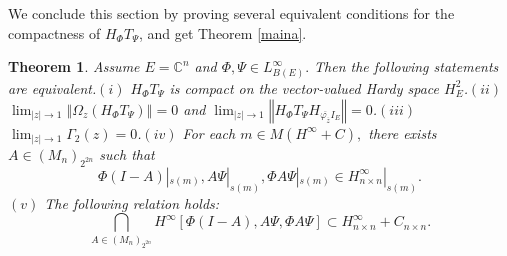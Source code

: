 \documentclass{article}%
\newtheorem{theorem}{Theorem}[section]
\begin{document}
We conclude this section by proving several equivalent conditions for the
compactness of $H_{\Phi}T_{\Psi}$, and get Theorem \ref{maina}.

\begin{theorem}
\label{main theorem TFAE} Assume $E=\mathbb{C}^{n}$ and $\Phi,\Psi\in
L_{B(E)}^{\infty}.$ Then the following statements are equivalent.\newline$(i)$
$H_{\Phi}T_{\Psi}$ is compact on the vector-valued Hardy space $H_{E}^{2}%
$.\newline$(ii)$ $\lim_{\left\vert z\right\vert \rightarrow1}\left\Vert
\Omega_{z}(H_{\Phi}T_{\Psi})\right\Vert =0$ and $\lim_{\left\vert z\right\vert
\rightarrow1}\left\Vert H_{\Phi}T_{\Psi}H_{\overline{\varphi_{\overline{z}}%
}I_{E}}\right\Vert =0$.\newline$(iii)$ $\lim_{\left\vert z\right\vert
\rightarrow1}\Gamma_{2}(z)=0$.\newline$(iv)$ For each $m\in M(H^{\infty}+C),$
there exists $A\in\left(  M_{n}\right)  _{2^{2n}}$ such that%
\[
\Phi(I-A)|_{s(m)},A\Psi|_{s(m)},\Phi A\Psi|_{s(m)}\in H_{n\times n}^{\infty
}|_{s(m)}.
\]
$(v)$ The following relation holds:
\begin{equation}
\bigcap_{A\in\left(  M_{n}\right)  _{2^{2n}}}H^{\infty}\left[  \Phi
(I-A),A\Psi,\Phi A\Psi\right]  \subset H_{n\times n}^{\infty}+C_{n\times
n}.\label{intersection}%
\end{equation}

\end{theorem}
\end{document}
